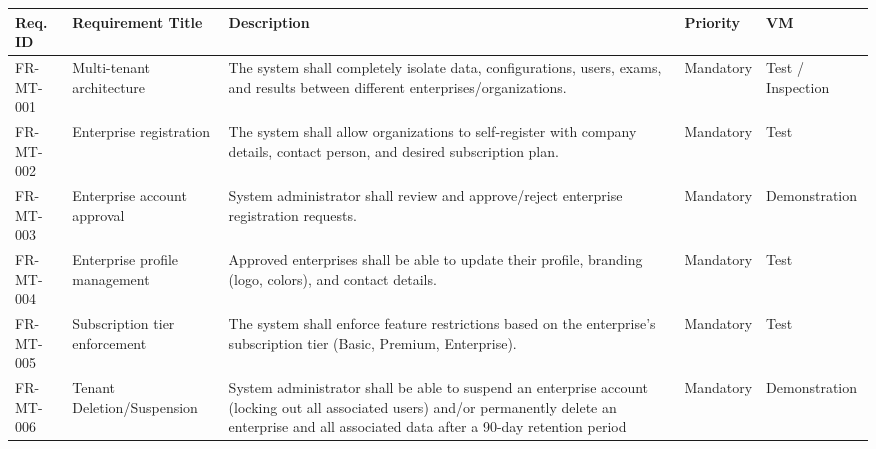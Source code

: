 \singlespacing
\captionsetup{hypcap=false}
\label{tab:enterprise-mt}
\renewcommand{\arraystretch}{1.5}
\setlength{\tabcolsep}{6pt}

\noindent
\begin{tabularx}{\linewidth}{|l|>{\raggedright\arraybackslash}p{4.5cm}|>{\raggedright\arraybackslash}X|l|l|}
\hline
\textbf{Req. ID} & \textbf{Requirement Title} & \textbf{Description} & \textbf{Priority} & \textbf{VM} \\ \hline
FR-MT-001 & Multi-tenant architecture & The system shall completely isolate data, configurations, users, exams, and results between different enterprises/organizations. & Mandatory & Test / Inspection \\ \hline
FR-MT-002 & Enterprise registration & The system shall allow organizations to self-register with company details, contact person, and desired subscription plan. & Mandatory & Test \\ \hline
FR-MT-003 & Enterprise account approval & System administrator shall review and approve/reject enterprise registration requests. & Mandatory & Demonstration \\ \hline
FR-MT-004 & Enterprise profile management & Approved enterprises shall be able to update their profile, branding (logo, colors), and contact details. & Mandatory & Test \\ \hline
FR-MT-005 & Subscription tier enforcement & The system shall enforce feature restrictions based on the enterprise's subscription tier (Basic, Premium, Enterprise). & Mandatory & Test \\ \hline
FR-MT-006 & Tenant Deletion/Suspension & System administrator shall be able to suspend an enterprise account (locking out all associated users) and/or permanently delete an enterprise and all associated data after a 90-day retention period & Mandatory & Demonstration \\ \hline
\end{tabularx}

\vspace{3em}

